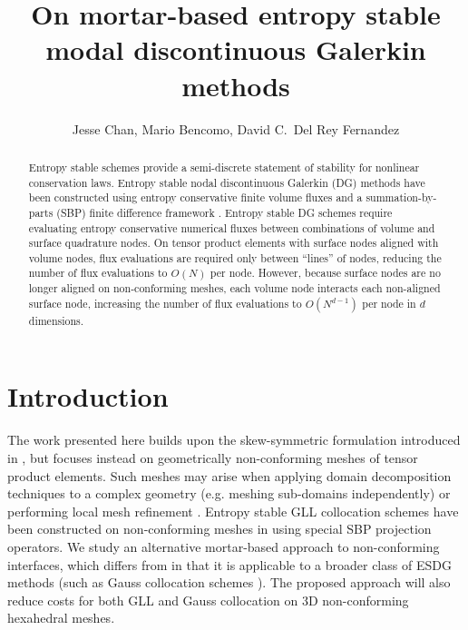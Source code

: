 \documentclass[review]{siamart0216}
\author{Jesse Chan, Mario Bencomo, David C.\ Del Rey Fernandez}
\title{On mortar-based entropy stable modal discontinuous Galerkin methods}
\newcommand{\note}[1]{{\color{blue}{#1}}}
\begin{document}
\maketitle

\begin{abstract}
Entropy stable schemes provide a semi-discrete statement of stability for nonlinear conservation laws.  Entropy stable nodal discontinuous Galerkin (DG) methods have been constructed using entropy conservative finite volume fluxes \cite{tadmor1987numerical} and a summation-by-parts (SBP) finite difference framework \cite{gassner2013skew, carpenter2014entropy, gassner2016split, chen2017entropy, crean2018entropy, chan2017discretely, chan2018efficient}.  Entropy stable DG schemes require evaluating entropy conservative numerical fluxes between combinations of volume and surface quadrature nodes.  On tensor product elements with surface nodes aligned with volume nodes, flux evaluations are required only between ``lines'' of nodes, reducing the number of flux evaluations to $O(N)$ per node.  However, because surface nodes are no longer aligned on non-conforming meshes, each volume node interacts each non-aligned surface node, increasing the number of flux evaluations to $O(N^{d-1})$ per node in $d$ dimensions.  
\end{abstract}

\section{Introduction}

\note{Boilerplate introduction on high order + stability}

The work presented here builds upon the skew-symmetric formulation introduced in \cite{chan2019skew}, but focuses instead on geometrically non-conforming meshes of tensor product elements.  Such meshes may arise when applying domain decomposition techniques to a complex geometry (e.g. meshing sub-domains independently)  \cite{maday1989non, bernardi1993domain} or performing local mesh refinement \cite{staten2010hexahedral}.  Entropy stable GLL collocation schemes have been constructed on non-conforming meshes in \cite{friedrich2017entropy} using special SBP projection operators.  We study an alternative mortar-based approach to non-conforming interfaces, which differs from \cite{friedrich2017entropy} in that it is applicable to a broader class of ESDG methods (such as Gauss collocation schemes \cite{chan2018efficient}).  The proposed approach will also reduce costs for both GLL and Gauss collocation on 3D non-conforming hexahedral meshes.  
\end{document}
